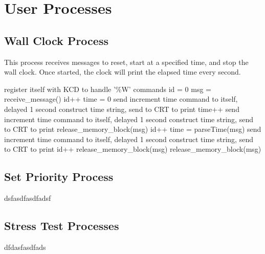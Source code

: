 \documentclass[12pt]{report}
\begin{document}

\section{User Processes}

\subsection{Wall Clock Process}

This process receives messages to reset, start at a specified time, and stop the wall clock. Once started, the clock will print the elapsed time every second.

\begin{algorithmic}[1]
    \State register itself with KCD to handle '\%W' commands
    \State id = 0
      \State msg = receive\_message()
        \State id++
        \State time = 0
        \State send increment time command to itself, delayed 1 second
        \State construct time string, send to CRT to print
          \State time++
          \State send increment time command to itself, delayed 1 second
          \State construct time string, send to CRT to print
        \Else
          \State release\_memory\_block(msg)
        \EndIf
        \State id++
        \State time = parseTime(msg)
        \State send increment time command to itself, delayed 1 second
        \State construct time string, send to CRT to print
        \State id++
        \State release\_memory\_block(msg)
      \Else
        \State release\_memory\_block(msg)
      \EndIf
    \EndWhile
  \EndFunction
\end{algorithmic}

\subsection{Set Priority Process}

dsfasdfasdfadsf

\subsection{Stress Test Processes}

dfdasfasdfads
\end{document}

